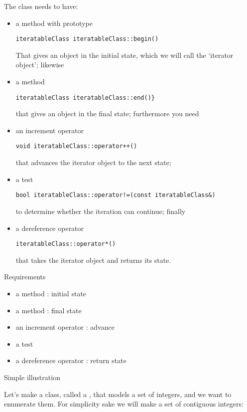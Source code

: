 The class needs to have:
\begin{itemize}
\item a method  with prototype
\begin{verbatim}
iteratableClass iteratableClass::begin()
\end{verbatim}
That gives an
  object in the initial state, which we will call the `iterator object'; likewise
\item a method 
\begin{verbatim}
iteratableClass iteratableClass::end()} 
\end{verbatim}
that gives an 
  object in the final state; furthermore you need
\item an increment operator
\begin{verbatim}
void iteratableClass::operator++()
\end{verbatim}
that
  advances the iterator object to the next state;
\item a test
\begin{verbatim}
bool iteratableClass::operator!=(const iteratableClass&)
\end{verbatim}
to determine
  whether the iteration can continue; finally
\item a dereference operator 
\begin{verbatim}
iteratableClass::operator*()
\end{verbatim}
that takes the
  iterator object and returns its state.
\end{itemize}

\begin{slide}{Requirements}
  \label{sl:rangemethods}
  \begin{itemize}
  \item a method : initial state
  \item a method :  final state
  \item an increment operator : advance
  \item a test 
  \item a dereference operator : return state
  \end{itemize}
\end{slide}

\begin{block}{Simple illustration}
  \label{sl:bagdata}
  
  Let's make a class, called a , that models a set of integers,
  and we want to enumerate them. For simplicity sake we will make a set
  of contiguous integers:
\end{block}

